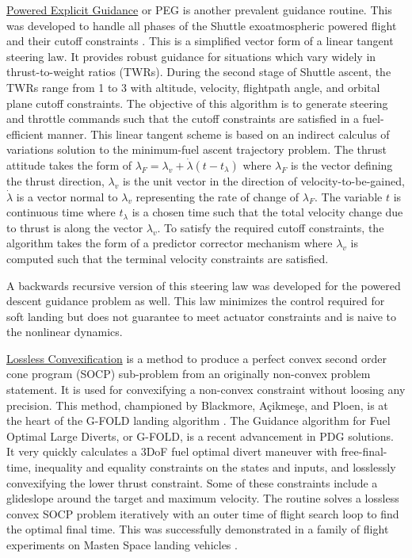 \underline{Powered Explicit Guidance} or PEG is another prevalent guidance routine. This was developed to handle all phases of the Shuttle exoatmospheric powered flight and their cutoff constraints \cite{mchenry1979space}. This is a simplified vector form of a linear tangent steering law. It provides robust guidance for situations which vary widely in thrust-to-weight ratios (TWRs). During the second stage of Shuttle ascent, the TWRs range from 1 to 3 with altitude, velocity, flightpath angle, and orbital plane cutoff constraints. The objective of this algorithm is to generate steering and throttle commands such that the cutoff constraints are satisfied in a fuel-efficient manner. This linear tangent scheme is based on an indirect calculus of variations solution to the minimum-fuel ascent trajectory problem. The thrust attitude takes the form of $\lambda_F = \lambda_v + \dot{\lambda}(t - t_\lambda)$ where $\lambda_F$ is the vector defining the thrust direction, $\lambda_v$ is the unit vector in the direction of velocity-to-be-gained, $\dot{\lambda}$ is a vector normal to $\lambda_v$ representing the rate of change of $\lambda_F$. The variable $t$ is continuous time where $t_\lambda$ is a chosen time such that the total velocity change due to thrust is along the vector $\lambda_v$. To satisfy the required cutoff constraints, the algorithm takes the form of a predictor corrector mechanism where $\lambda_v$ is computed such that the terminal velocity constraints are satisfied.

A backwards recursive version of this steering law was developed for the powered descent guidance problem as well. This law minimizes the control required for soft landing but does not guarantee to meet actuator constraints and is naive to the nonlinear dynamics.

\underline{Lossless Convexification} is a method to produce a perfect convex second order cone program (SOCP) sub-problem from an originally non-convex problem statement. It is used for convexifying a non-convex constraint without loosing any precision. This method, championed by Blackmore, Açikmeşe, and Ploen, is at the heart of the G-FOLD landing algorithm \cite{blackmore2010minimum} \cite{accikmecse2011lossless} \cite{acikmese2012g}. The Guidance algorithm for Fuel Optimal Large Diverts, or G-FOLD, is a recent advancement in PDG solutions. It very quickly calculates a 3DoF fuel optimal divert maneuver with free-final-time, inequality and equality constraints on the states and inputs, and losslessly convexifying the lower thrust constraint. Some of these constraints include a glideslope around the target and maximum velocity. The routine solves a lossless convex SOCP problem iteratively with an outer time of flight search loop to find the optimal final time. This was successfully demonstrated in a family of flight experiments on Masten Space landing vehicles \cite{acikmese2013flight} \cite{scharf2014adapt}.

